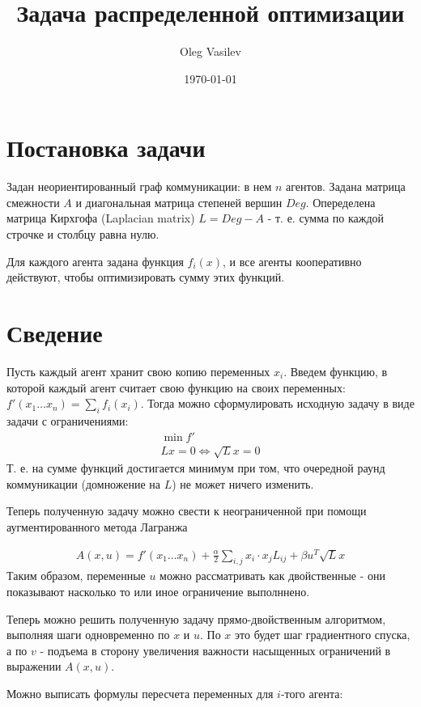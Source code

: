 \documentclass[a4paper, 10pt]{article}
\title{Задача распределенной оптимизации}
\date{\today}
\author{Oleg Vasilev}
\begin{document}
\maketitle

\section{Постановка задачи}
Задан неориентированный граф коммуникации: в нем $n$ агентов. Задана матрица смежности $A$ и диагональная матрица степеней вершин $Deg$. Опеределена матрица Кирхгофа (Laplacian matrix) $L = Deg - A$ - т. е. сумма по каждой строчке и столбцу равна нулю.

Для каждого агента задана функция $f_i(x)$, и все агенты кооперативно действуют, чтобы оптимизировать сумму этих функций.

\section{Сведение}

Пусть каждый агент хранит свою копию переменных $x_i$. Введем функцию, в которой каждый агент считает свою функцию на своих переменных: $f'(x_1 \dots x_n) = \sum_i f_i(x_i)$.
Тогда можно сформулировать исходную задачу в виде задачи с ограничениями:
\begin{gather}
\min f' \\
Lx = 0 \iff \sqrt{L}x = 0
\end{gather}
Т. е. на сумме функций достигается минимум при том, что очередной раунд коммуникации (домножение на $L$) не может ничего изменить.

Теперь полученную задачу можно свести к неограниченной при помощи аугментированного метода Лагранжа

\begin{gather}
    A(x, u) = f'(x_1 \dots x_n) + \frac{\alpha}{2} \sum_{i, j} x_i \cdot x_jL_{ij} + \beta u^T \sqrt{L}x
\end{gather}
Таким образом, переменные $u$ можно рассматривать как двойственные - они показывают насколько то или иное ограничение выполннено.

Теперь можно решить полученную задачу прямо-двойственным алгоритмом, выполняя шаги одновременно по $x$ и $u$. По $x$ это будет шаг градиентного спуска, а по $v$ - подъема в сторону увеличения важности насыщенных ограничений в выражении $A(x, u)$. 

Можно выписать формулы пересчета  переменных для $i$-того агента:
\end{document}
